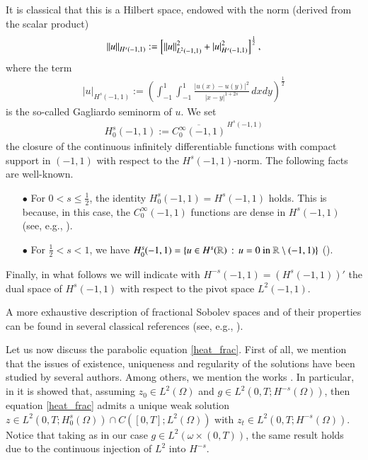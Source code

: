 It is classical that this is a Hilbert space, endowed with the norm (derived from the scalar product)
\begin{align*}
	{\left\|u\right\|}_{H^s(-1,1)} := \left[{\left\|u\right\|}_{L^2(-1,1)}^2 + |u|_{H^s(-1,1)}^2\right]^{\frac 12},
\end{align*}
where the term 
\begin{align*}
	|u|_{H^s(-1,1)}:= \left(\int_{-1}^1\int_{-1}^1 \frac{|u(x)-u(y)|^2}{|x-y|^{1+2s}}\,dxdy\right)^{\frac 12}
\end{align*}
is the so-called Gagliardo seminorm of $u$. We set 
\begin{align*}
H_0^s(-1,1):= \overline{C_0^\infty(-1,1)}^{\,H^s(-1,1)}
\end{align*}
the closure of the continuous infinitely differentiable functions with compact support in $(-1,1)$ with respect to the $H^s(-1,1)$-norm. The following facts are well-known.
\begin{itemize}
	\item[$\bullet$] For $0<s\leq\frac 12$, the identity $H_0^s(-1,1) = H^s(-1,1)$ holds. This is because, in this case, the $C_0^\infty(-1,1)$ functions are dense in $H^s(-1,1)$ (see, e.g., \cite[Theorem 11.1]{jllions1972non}).
	
	\item[$\bullet$] For $\frac 12<s<1$, we have $H_0^s(-1,1)=\left\{ u\in H^s(\mathbb{R})\,:\,u=0\textrm{ in } \mathbb{R}\setminus (-1,1)\right\}$ (\cite{fiscella2015density}).
\end{itemize}

Finally, in what follows we will indicate with $H^{-s}(-1,1)=\left(H^s(-1,1)\right)'$ the dual space of $H^s(-1,1)$ with respect to the pivot space $L^2(-1,1)$.

A more exhaustive description of fractional Sobolev spaces and of their properties can be found in several classical references (see, e.g., \cite{adams2003sobolev,dihitchhiker,jllions1972non}).

Let us now discuss the parabolic equation \eqref{heat_frac}. First of all, we mention that the issues of existence, uniqueness and regularity of the solutions have been studied by several authors. Among others, we mention the works \cite{biccari2017parabolic,fernandez2016boundary,leonori2015basic}. In particular, in \cite[Theorem 26]{leonori2015basic} it is showed that, assuming $z_0\in L^2(\Omega)$ and $g\in L^2(0,T;H^{-s}(\Omega))$, then equation \eqref{heat_frac} admits a unique weak solution $z\in L^2(0,T;H_0^s(\Omega))\cap C([0,T];L^2(\Omega))$ with $z_t\in L^2(0,T;H^{-s}(\Omega))$. Notice that taking as in our case $g\in L^2(\omega\times(0,T))$, the same result holds due to the continuous injection of $L^2$ into $H^{-s}$.

